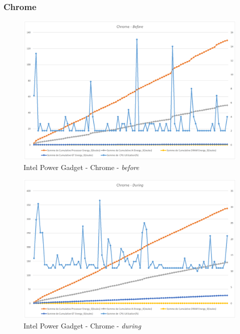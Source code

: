 \documentclass[12pt, a4paper]{report}
\begin{document}
\subsubsection{Chrome}
\label{subsubsec:chrome_ipg}
\begin{figure}[H]
    \centering
    \includegraphics[width=1\linewidth]{res//graph/IntelPowerGadget/chrome-before.png}
    \caption{Intel Power Gadget - Chrome - \textit{before}}
    \label{fig:ipg_chrome-before}
\end{figure}
\begin{figure}[H]
    \centering
    \includegraphics[width=1\linewidth]{res//graph/IntelPowerGadget/chrome-during.png}
    \caption{Intel Power Gadget - Chrome - \textit{during}}
    \label{fig:ipg_chrome-during}
\end{figure}
\end{document}
